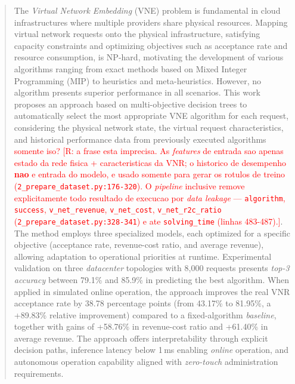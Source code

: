 \documentclass[runningheads]{llncs}
\begin{document}
\maketitle

\begin{abstract}
The \textit{Virtual Network Embedding} (VNE) problem is fundamental in cloud
infrastructures where multiple providers share physical resources. Mapping
virtual network requests onto the physical infrastructure, satisfying capacity
constraints and optimizing objectives such as acceptance rate and resource
consumption, is NP-hard, motivating the development of various algorithms
ranging from exact methods based on Mixed Integer Programming (MIP) to
heuristics and meta-heuristics. However, no algorithm presents superior
performance in all scenarios. This work proposes an approach based on
multi-objective decision trees to automatically select the most appropriate VNE
algorithm for each request, considering the physical network state, the
virtual request characteristics, and historical performance data from
previously executed algorithms \textcolor{red}{somente iso?} \textcolor{red}{[R: a frase esta imprecisa. As \emph{features} de entrada sao apenas estado da rede fisica + caracteristicas da VNR; o historico de desempenho \textbf{nao} e entrada do modelo, e usado somente para gerar os rotulos de treino (\texttt{2\_prepare\_dataset.py:176-320}). O \emph{pipeline} inclusive remove explicitamente todo resultado de execucao por \emph{data leakage} --- \texttt{algorithm}, \texttt{success}, \texttt{v\_net\_revenue}, \texttt{v\_net\_cost}, \texttt{v\_net\_r2c\_ratio} (\texttt{2\_prepare\_dataset.py:328-341}) e ate \texttt{solving\_time} (linhas 483-487).]}. The method employs three specialized models,
each optimized for a specific objective (acceptance rate, revenue-cost ratio,
and average revenue), allowing adaptation to operational priorities at
runtime. Experimental validation on three \textit{datacenter} topologies with
8,000 requests presents \textit{top-3 accuracy} between 79.1\% and 85.9\% in
predicting the best algorithm. When applied in simulated online operation, the
approach improves the real VNR acceptance rate by 38.78 percentage points
(from 43.17\% to 81.95\%, a +89.83\% relative improvement) compared to a
fixed-algorithm \textit{baseline}, together with gains of +58.76\% in
revenue-cost ratio and +61.40\% in average revenue. The approach offers
interpretability through explicit decision paths, inference latency below
1\,ms enabling \textit{online} operation, and autonomous operation capability
aligned with \textit{zero-touch} administration requirements.

\end{abstract}
\end{document}
